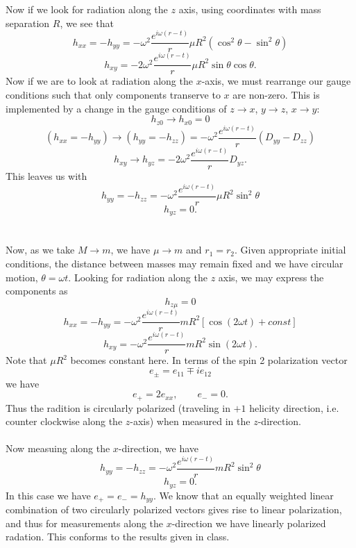 \documentclass[10pt,letterpaper]{article}
\begin{document}
Now if we look for radiation along the $z$ axis, using coordinates with mass separation $R$, we see that
\[
	h_{xx} = -h_{yy} =  -\omega^2\frac{e^{i\omega( r-t)}}{r}\mu R^2(\cos^2\theta - \sin^2\theta)
\]
\[
 	h_{xy} =  -2\omega^2\frac{e^{i\omega( r-t)}}{r}\mu R^2\sin\theta\cos\theta.
\]
Now if we are to look at radiation along the $x$-axis, we must rearrange our gauge conditions such that only components transerve to $x$ are non-zero. This is implemented by a change in the gauge conditions of 
$z\to x$, $y\to z$, $x\to y$:
\[
	h_{z0} \to h_{x0} = 0
\]
\[
	(h_{xx} = -h_{yy}) \to (h_{yy} = -h_{zz}) = -\omega^2\frac{e^{i\omega( r-t)}}{r}(D_{yy}-D_{zz})
\]
\[
	h_{xy} \to h_{yz} = -2\omega^2\frac{e^{i\omega(r-t)}}{r}D_{yz}.
\]
This leaves us with
\[
	h_{yy} = -h_{zz} =  -\omega^2\frac{e^{i\omega( r-t)}}{r}\mu R^2 \sin^2\theta
\]
\[
	h_{yz} = 0.
\]
\\ \\
Now, as we take $M\to m$, we have $\mu \to m$ and $r_1 = r_2$. Given appropriate initial conditions, the distance between masses may remain fixed and we have circular motion, $\theta = \omega t$. Looking for radiation along the $z$ axis, we may express the components as
\[
	h_{z\mu} = 0
\]
\[
	h_{xx} = -h_{yy} =  -\omega^2\frac{e^{i\omega( r-t)}}{r}m R^2[\cos(2\omega t) + const]
\]
\[
	h_{xy} =  -\omega^2\frac{e^{i\omega( r-t)}}{r}m R^2\sin(2\omega t).
\]
Note that $\mu R^2$ becomes constant here. In terms of the spin 2 polarization vector
\[
	e_{\pm} = e_{11}\mp ie_{12}
\]
we have
\[
	e_+ = 2e_{xx},\qquad e_- = 0.
\]
Thus the radition is circularly polarized  (traveling in $+1$ helicity direction, i.e. counter clockwise along the $z$-axis) when measured in the $z$-direction.
\\ \\
Now measuing along the $x$-direction, we have
\[
	h_{yy} = -h_{zz} =  -\omega^2\frac{e^{i\omega( r-t)}}{r}m R^2 \sin^2\theta
\]
\[
	h_{yz} = 0.
\]
In this case we have $e_+ = e_- = h_{yy}$. We know that an equally weighted  linear combination of two circularly polarized vectors gives rise to linear polarization, and thus for measurements along the $x$-direction we have linearly polarized radation. This conforms to the results given in class. 
\end{document}

